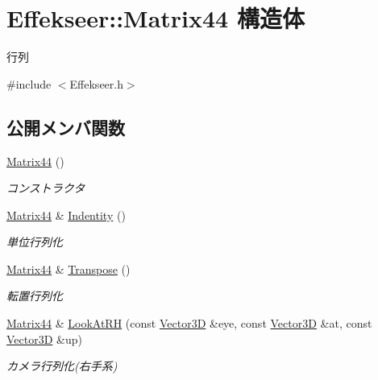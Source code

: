 \hypertarget{struct_effekseer_1_1_matrix44}{}\section{Effekseer\+:\+:Matrix44 構造体}
\label{struct_effekseer_1_1_matrix44}


行列  




{\ttfamily \#include $<$Effekseer.\+h$>$}

\subsection*{公開メンバ関数}
\begin{DoxyCompactItemize}
\item 
\mbox{\hyperlink{struct_effekseer_1_1_matrix44_a8dd9366a02a58a0652eaace2fd9bbb94}{Matrix44}} ()
\begin{DoxyCompactList}\small\item\em コンストラクタ \end{DoxyCompactList}\item 
\mbox{\hyperlink{struct_effekseer_1_1_matrix44}{Matrix44}} \& \mbox{\hyperlink{struct_effekseer_1_1_matrix44_a0c5ae8e73a0854b4e7d369ed2f159734}{Indentity}} ()
\begin{DoxyCompactList}\small\item\em 単位行列化 \end{DoxyCompactList}\item 
\mbox{\hyperlink{struct_effekseer_1_1_matrix44}{Matrix44}} \& \mbox{\hyperlink{struct_effekseer_1_1_matrix44_a9feeb08ed8858074e9bf433244ace76e}{Transpose}} ()
\begin{DoxyCompactList}\small\item\em 転置行列化 \end{DoxyCompactList}\item 
\mbox{\hyperlink{struct_effekseer_1_1_matrix44}{Matrix44}} \& \mbox{\hyperlink{struct_effekseer_1_1_matrix44_aa27b9ef241d27851b1a28da82b529cb5}{Look\+At\+RH}} (const \mbox{\hyperlink{struct_effekseer_1_1_vector3_d}{Vector3D}} \&eye, const \mbox{\hyperlink{struct_effekseer_1_1_vector3_d}{Vector3D}} \&at, const \mbox{\hyperlink{struct_effekseer_1_1_vector3_d}{Vector3D}} \&up)
\begin{DoxyCompactList}\small\item\em カメラ行列化(右手系) \end{DoxyCompactList}\item 

\end{DoxyCompactItemize}
